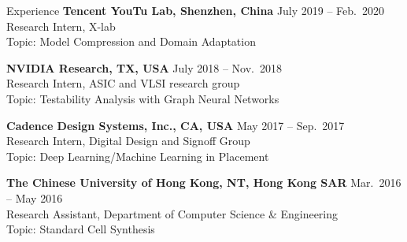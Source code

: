 
\begin{rSection}{Experience}
{\bf Tencent YouTu Lab, Shenzhen, China}         \hfill { July 2019 -- Feb.~2020} \\
Research Intern, X-lab\\
Topic: Model Compression and Domain Adaptation
    
{\bf NVIDIA Research, TX, USA}               \hfill { July 2018 -- Nov.~2018} \\
Research Intern, ASIC and VLSI research group\\
Topic: Testability Analysis with Graph Neural Networks

{\bf Cadence Design Systems, Inc., CA, USA}               \hfill { May 2017 -- Sep.~2017} \\
Research Intern, Digital Design and Signoff Group\\
Topic: Deep Learning/Machine Learning in Placement

{\bf The Chinese University of Hong Kong, NT, Hong Kong SAR}  \hfill { Mar.~2016 -- May 2016} \\ 
Research Assistant, Department of Computer Science \& Engineering \\
Topic: Standard Cell Synthesis

\end{rSection}


